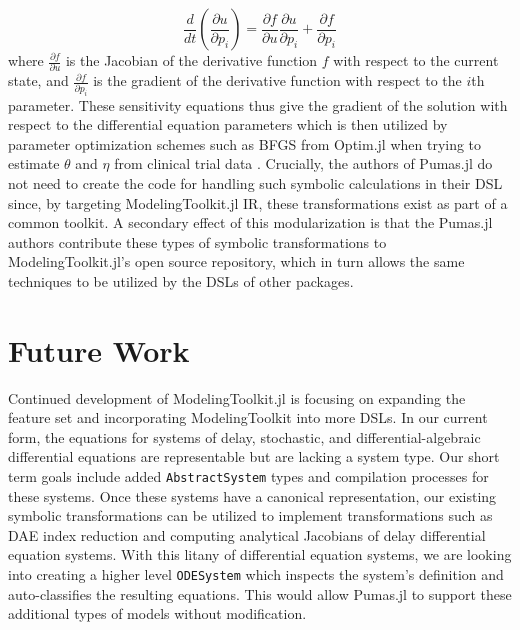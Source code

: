 \documentclass{juliacon}
\begin{document}
\begin{equation}
\frac{d}{dt}\left(\frac{\partial u}{\partial p_{i}}\right)=\frac{\partial f}{\partial u}\frac{\partial u}{\partial p_{i}}+\frac{\partial f}{\partial p_{i}}\label{eq:clsa}
\end{equation}
where $\frac{\partial f}{\partial u}$ is the Jacobian of the derivative
function $f$ with respect to the current state, and $\frac{\partial f}{\partial p_{i}}$ is the gradient of the derivative function with respect to the $i$th
parameter. These sensitivity equations thus give the gradient of the solution with respect to the differential equation parameters which is then utilized by parameter optimization schemes such as BFGS from Optim.jl \cite{mogensen2018optim} when trying to estimate $\theta$ and $\eta$ from clinical trial data  \cite{sommer_numerical_nodate}. Crucially, the authors of Pumas.jl do not need to create the code for handling such symbolic calculations in their DSL since, by targeting ModelingToolkit.jl IR, these transformations exist as part of a common toolkit. A secondary effect of this modularization is that the Pumas.jl authors contribute these types of symbolic transformations to ModelingToolkit.jl's open source repository, which in turn allows the same techniques to be utilized by the DSLs of other packages.

\section{Future Work \label{sec:future}}

Continued development of ModelingToolkit.jl is focusing on expanding the feature set and incorporating ModelingToolkit into more DSLs. In our current form, the equations for systems of delay, stochastic, and differential-algebraic differential equations are representable but are lacking a system type. Our short term goals include added \texttt{AbstractSystem} types and compilation processes for these systems. Once these systems have a canonical representation, our existing symbolic transformations can be utilized to implement transformations such as DAE index reduction and computing analytical Jacobians of delay differential equation systems. With this litany of differential equation systems, we are looking into creating a higher level \texttt{ODESystem} which inspects the system's definition and auto-classifies the resulting equations. This would allow Pumas.jl to support these additional types of models without modification.
\end{document}
